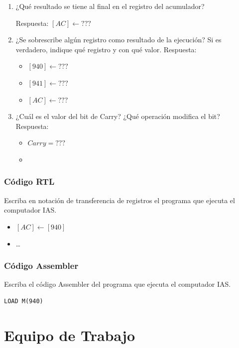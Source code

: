 \documentclass{article}
\begin{document}
\begin{enumerate}
\item ¿Qué resultado se tiene al final en el registro del acumulador?

Respuesta:
\([AC] \leftarrow ???\)

\item ¿Se sobrescribe algún registro como resultado de la ejecución? Si
es verdadero, indique qué registro y con qué valor.
Respuesta:
\begin{itemize}
\item \([940] \leftarrow ???\)
\item \([941] \leftarrow ???\)
\item \([AC] \leftarrow ???\)
\end{itemize}

\item ¿Cuál es el valor del bit de Carry? ¿Qué operación modifica el bit?
Respuesta:
\begin{itemize}
\item \(Carry = ???\)

\item 
\end{itemize}
\end{enumerate}

\subsubsection{Código RTL}
\label{sec:org5658039}

Escriba en notación de transferencia de registros el programa que
ejecuta el computador IAS.

\begin{itemize}
\item \([AC] \leftarrow [940]\)
\item \ldots{}
\end{itemize}


\subsubsection{Código Assembler}
\label{sec:orgaf25191}

Escriba el código Assembler del programa que ejecuta el computador IAS.

\begin{verbatim}
LOAD M(940)

\end{verbatim}

\section{Equipo de Trabajo}
\label{sec:orgf7771b1}
\end{document}
